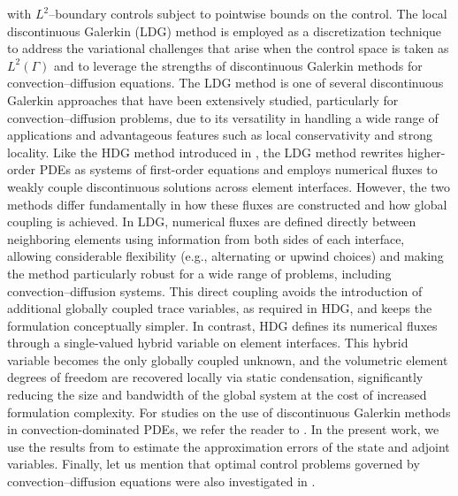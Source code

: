 \documentclass[a4paper,10pt]{article}
\numberwithin{theorem}{section}
\newcommand{\z}[2][blue]{#2}
\begin{document}
with $L^2$--boundary controls subject to pointwise bounds on the control.  The local discontinuous Galerkin (LDG) method is employed as a discretization technique to address the variational challenges that arise when the control space is taken as $L^2(\Gamma)$ and to leverage the strengths of discontinuous Galerkin methods for convection–diffusion equations. The LDG method is one of several discontinuous Galerkin approaches that have been extensively studied, particularly for convection–diffusion problems, due to its versatility in handling a wide range of applications and advantageous features such as local conservativity and strong locality. \z{Like the HDG method  introduced in \cite{BCockburn_JGopalakrishnan_RLazarov_2009}, the LDG method rewrites higher-order PDEs as systems of first-order equations and employs numerical fluxes to weakly couple discontinuous solutions across element interfaces. However, the two methods differ fundamentally in how these fluxes are constructed and how global coupling is achieved. In LDG, numerical fluxes are defined directly between neighboring elements using information from both sides of each interface, allowing considerable flexibility (e.g., alternating or upwind choices) and making the method particularly robust for a wide range of problems, including convection–diffusion systems. This direct coupling avoids the introduction of additional globally coupled trace variables, as required in HDG, and keeps the formulation conceptually simpler. In contrast, HDG defines its numerical fluxes through a single-valued hybrid variable on element interfaces. This hybrid variable becomes the only globally coupled unknown, and the volumetric element degrees of freedom are recovered locally via static condensation, significantly reducing the size and bandwidth of the global system at the cost of increased formulation complexity.} For studies on the use of discontinuous Galerkin methods in convection-dominated PDEs, we refer the reader to \cite{ABuffa_TJRHughes_GSangalli_2006a,PCastillo_BCockburn_DSchotzau_CSchwab_2002,JCesenek_MFeistauer_2012,YCheng_CWShu_2010,BCockburn_CWShu_1998b}. In the present work, we use the results from \cite{PCastillo_BCockburn_IPergugia_DSchotzau_2000,BCockburn_JGopalakrishnan_FJSayas_2010,JJiang_NJWalkington_YYue_2025} to estimate the approximation errors of the state and adjoint variables. Finally, let us mention that optimal control problems governed by convection–diffusion equations were also investigated in  \cite{PBenner_HYucel_2017,DLeykekhman_MHeinkenschloss_2012a,HYucel_PBenner_2015a,HYucel_MHeinkenschloss_BKarasozen_2013,ZZhou_XYu_NYan_2014a}.
\end{document}
